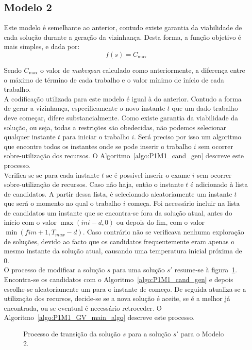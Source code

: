 \subsection{Modelo 2}

Este modelo é semelhante ao anterior, contudo existe garantia da viabilidade de cada solução durante a geração da vizinhança. Desta forma, a função objetivo é mais simples, e dada por:
$$f(s) = C_{\max}$$

Sendo $C_{\max}$ o valor de \textit{makespan} calculado como anteriormente, a diferença entre o máximo de término de cada trabalho e o valor mínimo de início de cada trabalho.\\

A codificação utilizada para este modelo é igual à do anterior. Contudo a forma de gerar a vizinhança, especificamente o novo instante $t$ que um dado trabalho deve começar, difere substancialmente. Como existe garantia da viabilidade da solução, ou seja, todas a restrições são obedecidas, não podemos selecionar qualquer instante $t$ para iniciar o trabalho $i$. Será preciso por isso um algoritmo que encontre todos os instantes onde se pode inserir o trabalho $i$ sem ocorrer sobre-utilização dos recursos. O Algoritmo~\ref{algo:P1M1_cand_gen} descreve este processo.\\

Verifica-se se para cada instante $t$ se é possível inserir o exame $i$ sem ocorrer sobre-utilização de recursos. Caso não haja, então o instante $t$ é adicionado à lista de candidatos. A partir dessa lista, é selecionado aleatoriamente um instante $t$ que será o momento no qual o trabalho $i$ começa. Foi necessário incluir na lista de candidatos um instante que se encontra-se fora da solução atual, antes do início com o valor $\max(\textit{ini}-d, 0)$ ou depois do fim, com o valor $\min(\textit{fim}+1, T_{max}-d)$. Caso contrário não se verificava nenhuma exploração de soluções, devido ao facto que os candidatos frequentemente eram apenas o mesmo instante da solução atual, causando uma temperatura inicial próxima de 0.\\

O processo de modificar a solução $s$ para uma solução $s'$ resume-se à figura~\ref{fig:P1M1_GV_viz}. Encontra-se os candidatos com o Algoritmo~\ref{algo:P1M1_cand_gen} e depois escolhe-se aleatoriamente um para o instante de começo. De seguida atualiza-se a utilização dos recursos, decide-se se a nova solução é aceite, se é a melhor já encontrada, ou se eventual é necessário retroceder. O Algoritmo~\ref{algo:P1M1_GV_main_algo} descreve este processo.\\
\begin{figure}[H]
	\centering
	\caption{Processo de transição da solução $s$ para a solução $s'$ para o Modelo 2.}
	\label{fig:P1M1_GV_viz}
\end{figure}

